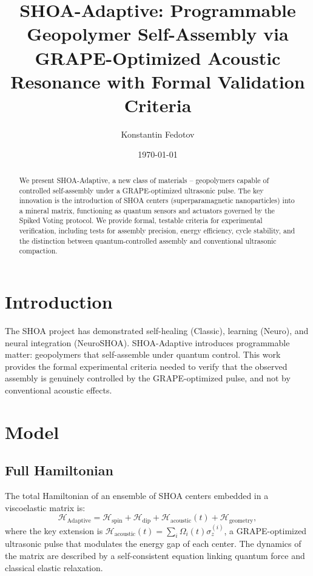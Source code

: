 \documentclass[12pt]{article}
\title{SHOA-Adaptive: Programmable Geopolymer Self-Assembly via GRAPE-Optimized Acoustic Resonance with Formal Validation Criteria}
\author{Konstantin Fedotov}
\date{\today}
\begin{document}
\maketitle

\begin{abstract}
We present SHOA-Adaptive, a new class of materials -- geopolymers capable of controlled self-assembly under a GRAPE-optimized ultrasonic pulse. The key innovation is the introduction of SHOA centers (superparamagnetic nanoparticles) into a mineral matrix, functioning as quantum sensors and actuators governed by the Spiked Voting protocol. We provide formal, testable criteria for experimental verification, including tests for assembly precision, energy efficiency, cycle stability, and the distinction between quantum-controlled assembly and conventional ultrasonic compaction.
\end{abstract}

\section{Introduction}
The SHOA project has demonstrated self-healing (Classic), learning (Neuro), and neural integration (NeuroSHOA). SHOA-Adaptive introduces programmable matter: geopolymers that self-assemble under quantum control. This work provides the formal experimental criteria needed to verify that the observed assembly is genuinely controlled by the GRAPE-optimized pulse, and not by conventional acoustic effects.

\section{Model}
\subsection{Full Hamiltonian}
The total Hamiltonian of an ensemble of SHOA centers embedded in a viscoelastic matrix is:
\begin{equation}
\mathcal{H}_{\text{Adaptive}} = \mathcal{H}_{\text{spin}} + \mathcal{H}_{\text{dip}} + \mathcal{H}_{\text{acoustic}}(t) + \mathcal{H}_{\text{geometry}},
\end{equation}
where the key extension is $\mathcal{H}_{\text{acoustic}}(t) = \sum_i \Omega_i(t) \sigma_z^{(i)}$, a GRAPE-optimized ultrasonic pulse that modulates the energy gap of each center. The dynamics of the matrix are described by a self-consistent equation linking quantum force and classical elastic relaxation.
\end{document}
